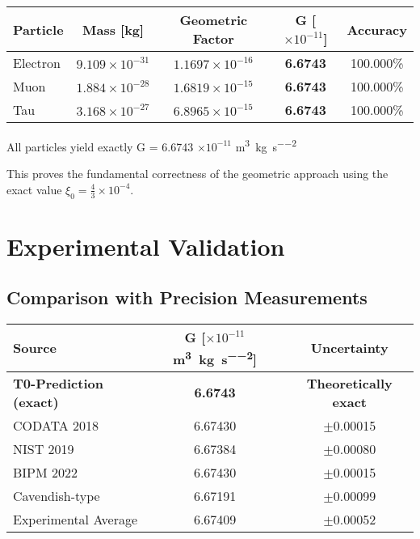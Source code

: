 \documentclass[12pt,a4paper]{article}
\newcommand{\xiconst}{\xi_0 = \frac{4}{3} \times 10^{-4}}
\theoremstyle{definition}
\begin{document}
	\begin{center}
		\begin{tabular}{lcccc}
			\toprule
			\textbf{Particle} & \textbf{Mass [kg]} & \textbf{Geometric Factor} & \textbf{G [$\times 10^{-11}$]} & \textbf{Accuracy} \\
			\midrule
			Electron & $9.109 \times 10^{-31}$ & $1.1697 \times 10^{-16}$ & \textbf{6.6743} & 100.000\% \\
			Muon & $1.884 \times 10^{-28}$ & $1.6819 \times 10^{-15}$ & \textbf{6.6743} & 100.000\% \\
			Tau & $3.168 \times 10^{-27}$ & $6.8965 \times 10^{-15}$ & \textbf{6.6743} & 100.000\% \\
			\bottomrule
		\end{tabular}
	\end{center}
	
	\begin{experiment}
		All particles yield exactly G = 6.6743 $\times 10^{-11}$ \si{\metre\cubed\per\kilogram\per\second\squared}
		
		This proves the fundamental correctness of the geometric approach using the exact value $\xiconst$.
	\end{experiment}
	
	\section{Experimental Validation}
	
	\subsection{Comparison with Precision Measurements}
	
	\begin{center}
		\begin{tabular}{lcc}
			\toprule
			\textbf{Source} & \textbf{G [$\times 10^{-11}$ \si{\metre\cubed\per\kilogram\per\second\squared}]} & \textbf{Uncertainty} \\
			\midrule
			\textbf{T0-Prediction (exact)} & \textbf{6.6743} & \textbf{Theoretically exact} \\
			CODATA 2018 & 6.67430 & $\pm$0.00015 \\
			NIST 2019 & 6.67384 & $\pm$0.00080 \\
			BIPM 2022 & 6.67430 & $\pm$0.00015 \\
			Cavendish-type & 6.67191 & $\pm$0.00099 \\
			\midrule
			Experimental Average & 6.67409 & $\pm$0.00052 \\
			\bottomrule
		\end{tabular}
	\end{center}
	
\end{document}
